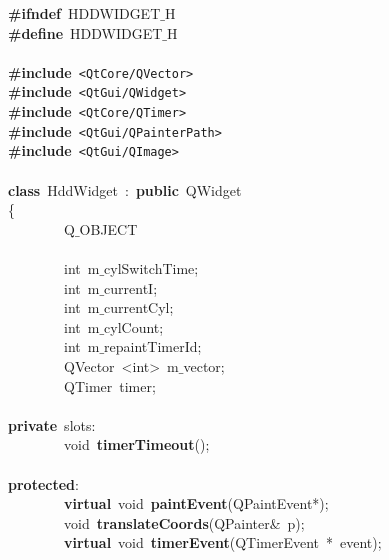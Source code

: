 \noindent
\mbox{}\textbf{\#ifndef}\ HDDWIDGET$\_$H \\
\mbox{}\textbf{\#define}\ HDDWIDGET$\_$H \\
\mbox{} \\
\mbox{}\textbf{\#include}\ \texttt{\textless{}QtCore/QVector\textgreater{}} \\
\mbox{}\textbf{\#include}\ \texttt{\textless{}QtGui/QWidget\textgreater{}} \\
\mbox{}\textbf{\#include}\ \texttt{\textless{}QtCore/QTimer\textgreater{}} \\
\mbox{}\textbf{\#include}\ \texttt{\textless{}QtGui/QPainterPath\textgreater{}} \\
\mbox{}\textbf{\#include}\ \texttt{\textless{}QtGui/QImage\textgreater{}} \\
\mbox{} \\
\mbox{}\textbf{class}\ HddWidget\ :\ \textbf{public}\ QWidget \\
\mbox{}\{ \\
\mbox{}\ \ \ \ \ \ \ \ Q$\_$OBJECT \\
\mbox{} \\
\mbox{}\ \ \ \ \ \ \ \ int\ m$\_$cylSwitchTime; \\
\mbox{}\ \ \ \ \ \ \ \ int\ m$\_$currentI; \\
\mbox{}\ \ \ \ \ \ \ \ int\ m$\_$currentCyl; \\
\mbox{}\ \ \ \ \ \ \ \ int\ m$\_$cylCount; \\
\mbox{}\ \ \ \ \ \ \ \ int\ m$\_$repaintTimerId; \\
\mbox{}\ \ \ \ \ \ \ \ QVector\ \textless{}int\textgreater{}\ m$\_$vector; \\
\mbox{}\ \ \ \ \ \ \ \ QTimer\ timer; \\
\mbox{} \\
\mbox{}\textbf{private}\ slots: \\
\mbox{}\ \ \ \ \ \ \ \ void\ \textbf{timerTimeout}(); \\
\mbox{} \\
\mbox{}\textbf{protected}: \\
\mbox{}\ \ \ \ \ \ \ \ \textbf{virtual}\ void\ \textbf{paintEvent}(QPaintEvent*); \\
\mbox{}\ \ \ \ \ \ \ \ void\ \textbf{translateCoords}(QPainter\&\ p); \\
\mbox{}\ \ \ \ \ \ \ \ \textbf{virtual}\ void\ \textbf{timerEvent}(QTimerEvent\ *\ event); \\
